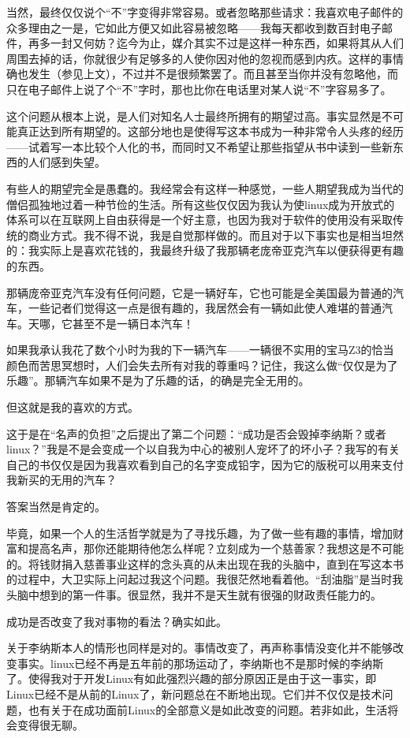 当然，最终仅仅说个“不”字变得非常容易。或者忽略那些请求：我喜欢电子邮件的众多理由之一是，它如此方便又如此容易被忽略——我每天都收到数百封电子邮件，再多一封又何妨？迄今为止，媒介其实不过是这样一种东西，如果将其从人们周围去掉的话，你就很少有足够多的人使你因对他的忽视而感到内疚。这样的事情确也发生（参见上文），不过并不是很频繁罢了。而且甚至当你并没有忽略他，而只在电子邮件上说了个“不”字时，那也比你在电话里对某人说“不”字容易多了。

这个问题从根本上说，是人们对知名人士最终所拥有的期望过高。事实显然是不可能真正达到所有期望的。这部分地也是使得写这本书成为一种非常令人头疼的经历——试着写一本比较个人化的书，而同时又不希望让那些指望从书中读到一些新东西的人们感到失望。

有些人的期望完全是愚蠢的。我经常会有这样一种感觉，一些人期望我成为当代的僧侣孤独地过着一种节俭的生活。所有这些仅仅因为我认为使linux成为开放式的体系可以在互联网上自由获得是一个好主意，也因为我对于软件的使用没有采取传统的商业方式。我不得不说，我是自觉那样做的。而且对于以下事实也是相当坦然的：我实际上是喜欢花钱的，我最终升级了我那辆老庞帝亚克汽车以便获得更有趣的东西。

那辆庞帝亚克汽车没有任何问题，它是一辆好车，它也可能是全美国最为普通的汽车，一些记者们觉得这一点是很有趣的，我居然会有一辆如此使人难堪的普通汽车。天哪，它甚至不是一辆日本汽车！

如果我承认我花了数个小时为我的下一辆汽车——一辆很不实用的宝马Z3的恰当颜色而苦思冥想时，人们会失去所有对我的尊重吗？记住，我这么做“仅仅是为了乐趣”。那辆汽车如果不是为了乐趣的话，的确是完全无用的。

但这就是我的喜欢的方式。

这于是在“名声的负担”之后提出了第二个问题：“成功是否会毁掉李纳斯？或者linux？”我是不是会变成一个以自我为中心的被别人宠坏了的坏小子？我写的有关自己的书仅仅是因为我喜欢看到自己的名字变成铅字，因为它的版税可以用来支付我新买的无用的汽车？

答案当然是肯定的。

毕竟，如果一个人的生活哲学就是为了寻找乐趣，为了做一些有趣的事情，增加财富和提高名声，那你还能期待他怎么样呢？立刻成为一个慈善家？我想这是不可能的。将钱财捐入慈善事业这样的念头真的从未出现在我的头脑中，直到在写这本书的过程中，大卫实际上问起过我这个问题。我很茫然地看着他。“刮油脂”是当时我头脑中想到的第一件事。很显然，我并不是天生就有很强的财政责任能力的。

成功是否改变了我对事物的看法？确实如此。

关于李纳斯本人的情形也同样是对的。事情改变了，再声称事情没变化并不能够改变事实。linux已经不再是五年前的那场运动了，李纳斯也不是那时候的李纳斯了。使得我对于开发Linux有如此强烈兴趣的部分原因正是由于这一事实，即Linux已经不是从前的Linux了，新问题总在不断地出现。它们并不仅仅是技术问题，也有关于在成功面前Linux的全部意义是如此改变的问题。若非如此，生活将会变得很无聊。

